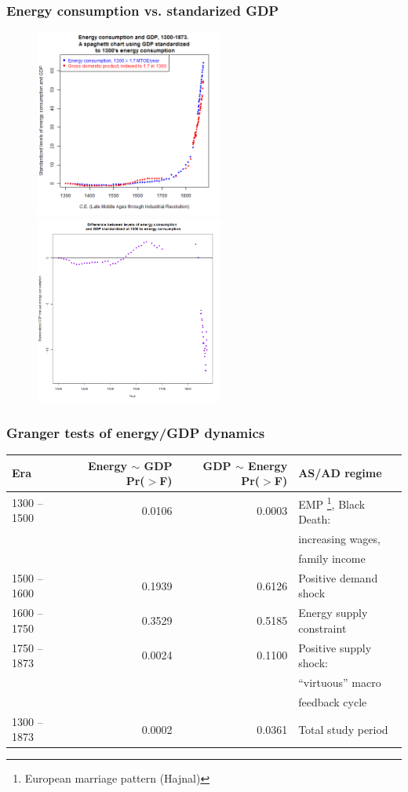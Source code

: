 \documentclass[final]{beamer}
\begin{document}
\begin{frame}
\frametitle{Energy consumption vs. standarized GDP}
\begin{figure}[p!]
\center
\label{fig:energyVsGdp}
		\centerline{
		\mbox{\includegraphics[width=0.55\textwidth]{energyVsGdp}}
		\mbox{\includegraphics[width=0.55\textwidth]{energyVsGdpDiff}}
		}
\end{figure}
\end{frame}


\begin{frame}
\frametitle{Granger tests of energy/GDP dynamics}
\scriptsize{
\begin{table}[p!]
\label{tbl:grangerEnergyGdp}
\begin{tabular}{lrrl}
Era&Energy $\sim$ GDP Pr($>$F)& GDP $\sim$ Energy Pr($>$F)&AS/AD regime\\
\hline \hline
1300 -- 1500&0.0106&0.0003&EMP \footnote{European marriage pattern (Hajnal)}, Black Death: \\&&&increasing wages, \\
&&&family income\\
1500 -- 1600&0.1939&0.6126&Positive demand shock\\
1600 -- 1750&0.3529&0.5185&Energy supply constraint\\
1750 -- 1873&0.0024&0.1100&Positive supply shock:\\&&&``virtuous'' macro \\
&&&feedback cycle\\
\hline
1300 -- 1873& 0.0002& 0.0361&Total study period\\
\end{tabular}
\end{table}
}
\end{frame}
\end{document}
